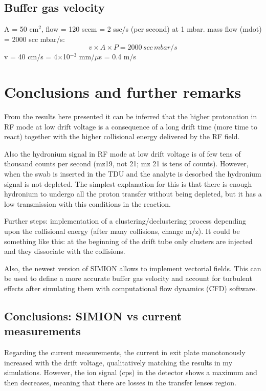 \subsection{Buffer gas velocity}
A = 50 cm$^{2}$, flow = 120 sccm = 2 ssc/s (per second) at 1 mbar. mass flow (mdot) = 2000 scc  mbar/s:
\begin{equation}
v \times A \times P = 2000\, scc \, mbar / s
\end{equation}
v = 40 cm/s = 4$\times$10$^{-3}$ mm/$\mu$s = 0.4 m/s

\newpage
\section{Conclusions and further remarks}
From the results here presented it can be inferred that the higher protonation in RF mode at low drift voltage is a consequence of a long drift time (more time to react) together with the higher collisional energy delivered by the RF field.

Also the hydronium signal in RF mode at low drift voltage is of few tens of thousand counts per second (mz19, not 21; mz 21 is tens of counts). However, when the swab is inserted in the TDU and the analyte is desorbed the hydronium signal is not depleted. The simplest explanation for this is that there is enough hydronium to undergo all the proton transfer without being depleted, but it has a low transmission with this conditions in the reaction.


Further steps: implementation of a clustering/declustering process depending upon the collisional energy (after many collisions, change m/z). It could be something like this: at the beginning of the drift tube only clusters are injected and they dissociate with the collisions. 

Also, the newest version of SIMION allows to implement vectorial fields. This can be used to define a more accurate buffer gas velocity and account for turbulent effects after simulating them with computational flow dynamics (CFD) software.



\subsection{Conclusions: SIMION vs current measurements}
Regarding the current measurements, the current in exit plate monotonously increased with the drift voltage, qualitatively matching the results in my simulations. However, the ion signal (cps) in the detector shows a maximum and then decreases, meaning that there are losses in the transfer lenses region. 



















